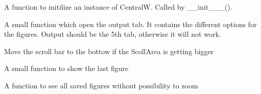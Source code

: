 \documentclass[letterpaper,10pt,english]{sphinxmanual}
\begin{document}
\begin{fulllineitems}
\begin{fulllineitems}
\end{fulllineitems}


\begin{fulllineitems}
\label{\detokenize{index:src_GUI.Main_windows_1.CentralW.init_iu}}
A function to initilize an instance of CentralW. Called by \_\_init\_\_\_().

\end{fulllineitems}


\begin{fulllineitems}
\label{\detokenize{index:src_GUI.Main_windows_1.CentralW.optfig}}
A small function which open the output tab. It contains the different options for the figures.
Output should be the 5th tab, otherwise it will not work.

\end{fulllineitems}


\begin{fulllineitems}
\label{\detokenize{index:src_GUI.Main_windows_1.CentralW.scrolldown}}
Move the scroll bar to the bottow if the ScollArea is getting bigger

\end{fulllineitems}


\begin{fulllineitems}
\label{\detokenize{index:src_GUI.Main_windows_1.CentralW.showfig}}
A small function to show the last figure

\end{fulllineitems}


\begin{fulllineitems}
\label{\detokenize{index:src_GUI.Main_windows_1.CentralW.showfig2}}
A function to see all saved figures without possibility to zoom


\end{fulllineitems}
\end{fulllineitems}
\end{document}
